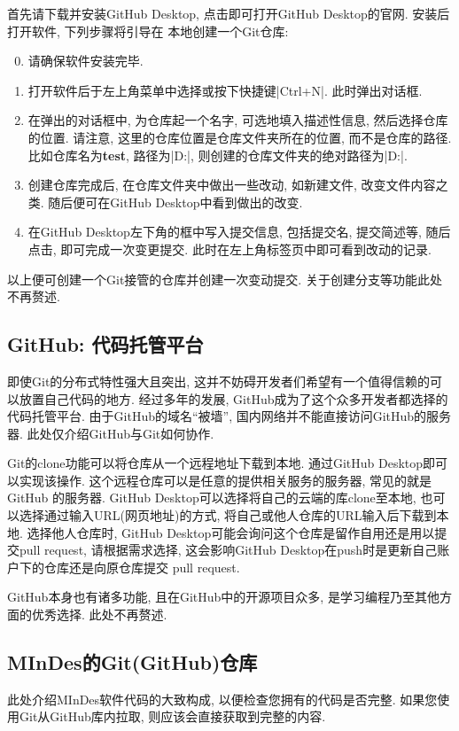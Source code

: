 首先请下载并安装GitHub Desktop, 点击即可打开GitHub Desktop的官网. 安装后打开软件, 下列步骤将引导在
本地创建一个Git仓库:
\begin{enumerate}
      \setcounter{enumi}{-1}
      \item 请确保软件安装完毕.
      \item 打开软件后于左上角{}菜单中选择{}或按下快捷键\cverb|Ctrl+N|. 此时弹出对话框.
      \item 在弹出的对话框中, 为仓库起一个名字, 可选地填入描述性信息, 然后选择仓库的位置. 请注意, 这里的仓库位置是仓库文件夹所在的位置, 而不是仓库的路径.
            比如仓库名为\textbf{test}, 路径为\cverb|D:\Repositories|, 则创建的仓库文件夹的绝对路径为\cverb|D:\Repositories\test|.
      \item 创建仓库完成后, 在仓库文件夹中做出一些改动, 如新建文件, 改变文件内容之类. 随后便可在GitHub Desktop中看到做出的改变.
      \item 在GitHub Desktop左下角的框中写入提交信息, 包括提交名, 提交简述等, 随后点击{}, 即可完成一次变更提交.
            此时在左上角标签页{}中即可看到改动的记录.
\end{enumerate}
以上便可创建一个Git接管的仓库并创建一次变动提交. 关于创建分支等功能此处不再赘述.

\subsection{GitHub: 代码托管平台}
即使Git的分布式特性强大且突出, 这并不妨碍开发者们希望有一个值得信赖的可以放置自己代码的地方. 经过多年的发展, GitHub成为了这个众多开发者都选择的代码托管平台.
由于GitHub的域名``被墙'', 国内网络并不能直接访问GitHub的服务器. 此处仅介绍GitHub与Git如何协作.

Git的clone功能可以将仓库从一个远程地址下载到本地. 通过GitHub Desktop即可以实现该操作. 这个远程仓库可以是任意的提供相关服务的服务器, 常见的就是GitHub
的服务器. GitHub Desktop可以选择将自己的云端的库clone至本地, 也可以选择通过输入URL(网页地址)的方式, 将自己或他人仓库的URL输入后下载到本地. 选择他人仓库时,
GitHub Desktop可能会询问这个仓库是留作自用还是用以提交pull request, 请根据需求选择, 这会影响GitHub Desktop在push时是更新自己账户下的仓库还是向原仓库提交
pull request.

GitHub本身也有诸多功能, 且在GitHub中的开源项目众多, 是学习编程乃至其他方面的优秀选择. 此处不再赘述.

\subsection{MInDes的Git(GitHub)仓库}
此处介绍MInDes软件代码的大致构成, 以便检查您拥有的代码是否完整. 如果您使用Git从GitHub库内拉取, 则应该会直接获取到完整的内容.

